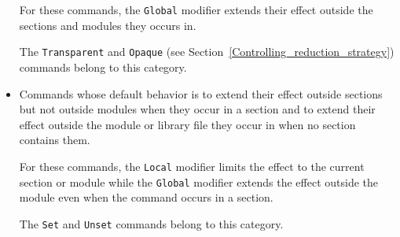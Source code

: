 \begin{itemize}
  For these commands, the {\tt Global} modifier extends their effect
  outside the sections and modules they occurs in.

  The {\tt Transparent} and {\tt Opaque} (see
  Section~\ref{Controlling_reduction_strategy}) commands belong to
  this category.

\item Commands whose default behavior is to extend their effect
  outside sections but not outside modules when they occur in a
  section and to extend their effect outside the module or library
  file they occur in when no section contains them.

  For these commands, the {\tt Local} modifier limits the effect to
  the current section or module while the {\tt Global} modifier extends
  the effect outside the module even when the command occurs in a section.

  The {\tt Set} and {\tt Unset} commands belong to this category.
\end{itemize}


